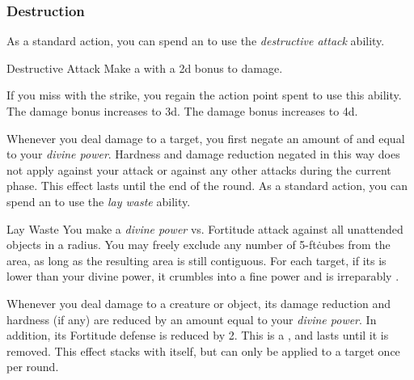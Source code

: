         \subsubsection{Destruction}
             As a standard action, you can spend an  to use the \textit{destructive attack} ability.
            \begin{ability}{Destructive Attack}
                Make a  with a \plus2d bonus to damage.

                \rankline
                 If you miss with the strike, you regain the action point spent to use this ability.
                 The damage bonus increases to \plus3d.
                 The damage bonus increases to \plus4d.
            \end{ability}
             Whenever you deal damage to a target, you first negate an amount of  and  equal to your \textit{divine power}.
            Hardness and damage reduction negated in this way does not apply against your attack or against any other attacks during the current phase.
            This effect lasts until the end of the round.
             As a standard action, you can spend an  to use the \textit{lay waste} ability.
            \begin{ability}{Lay Waste}
                You make a \textit{divine power} vs. Fortitude attack against all unattended objects in a \arealarge radius.
                You may freely exclude any number of 5-ft\. cubes from the area, as long as the resulting area is still contiguous.
                \hit For each target, if its  is lower than your divine power, it crumbles into a fine power and is irreparably .
            \end{ability}
             Whenever you deal damage to a creature or object, its damage reduction and hardness (if any) are reduced by an amount equal to your \textit{divine power}.
            In addition, its Fortitude defense is reduced by 2.
            This is a , and lasts until it is removed.
            This effect stacks with itself, but can only be applied to a target once per round.

